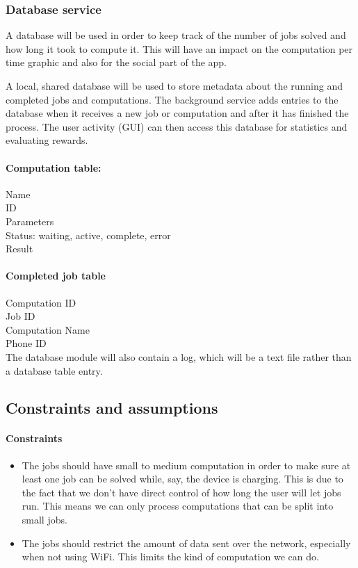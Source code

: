\documentclass[a4paper,10pt]{article}
\begin{document}
\subsubsection{Database service}

A database will be used in order to keep track of the number of jobs solved and how long it took to compute it. This will have an impact on the computation per time graphic and also for the social part of the app.

A local, shared database will be used to store metadata about the running and completed jobs and computations. The background service adds entries to the database when it receives a new job or computation and after it has finished the process. The user activity (GUI) can then access this database for statistics and evaluating rewards.

\paragraph{Computation table:}
Name\\
ID\\
Parameters\\
Status: waiting, active, complete, error\\
Result

\paragraph{Completed job table}

Computation ID\\
Job ID\\
Computation Name\\
Phone ID\\

\noindent The database module will also contain a log, which will be a text file rather than a database table entry.

\subsection{Constraints and assumptions}%
\paragraph{Constraints}
\begin{itemize}
	\item The jobs should have small to medium computation in order to make sure at least one job can be solved while, say, the device is charging. This is due to the fact that we don't have direct control of how long the user will let jobs run. This means we can only process computations that can be split into small jobs.

	\item The jobs should restrict the amount of data sent over the network, especially when not using WiFi. This limits the kind of computation we can do.
\end{itemize} 
\end{document}
